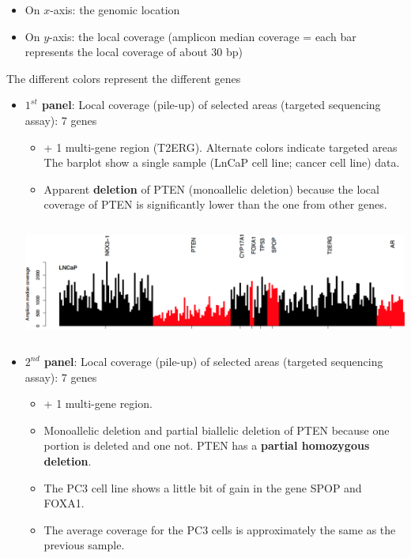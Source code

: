 \begin{itemize}
  \item On $x$-axis: the genomic location
  \item On $y$-axis: the local coverage (amplicon median coverage = each bar
  represents the local coverage of about 30 bp)
\end{itemize}

The different colors represent the different genes


\begin{itemize}
  \item \textbf{$1^{st}$ panel}: Local coverage (pile-up) of selected areas
  (targeted sequencing assay): 7 genes

  \begin{itemize}
    \item + 1 multi-gene region (T2ERG). Alternate colors indicate targeted
    areas The barplot show a single sample (LnCaP cell line; cancer cell line)
    data.
    \item Apparent \textbf{deletion} of PTEN (monoallelic deletion) because the
    local coverage of PTEN is significantly lower than the one from other genes.
  \end{itemize}
  
  \includegraphics[width=6.13481in,height=1.52625in]{image16.png}

  \item \textbf{$2^{nd}$ panel}: Local coverage (pile-up) of selected areas
  (targeted sequencing assay): 7 genes

  \begin{itemize}
    \item + 1 multi-gene region.
    \item Monoallelic deletion and partial biallelic deletion of PTEN because
    one portion is deleted and one not. PTEN has a \textbf{partial homozygous
    deletion}.
    \item The PC3 cell line shows a little bit of gain in the gene SPOP and
    FOXA1.
    \item The average coverage for the PC3 cells is approximately the same as
    the previous sample.
  \end{itemize}
  

\end{itemize}
